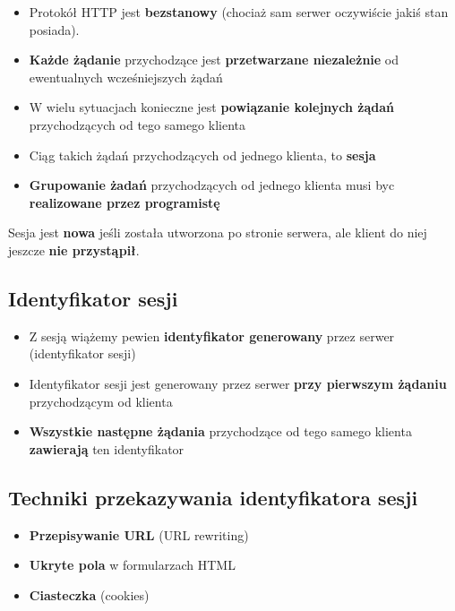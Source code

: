 \documentclass[../main.tex]{subfiles}
\begin{document}
    \begin{itemize}
        \item Protokół HTTP jest \textbf{bezstanowy} (chociaż sam serwer oczywiście jakiś stan posiada).
        \item \textbf{Każde żądanie} przychodzące jest \textbf{przetwarzane niezależnie} od ewentualnych wcześniejszych żądań
        \item W wielu sytuacjach konieczne jest \textbf{powiązanie kolejnych żądań} przychodzących od tego samego klienta
        \item Ciąg takich żądań przychodzących od jednego klienta, to \textbf{sesja}
        \item \textbf{Grupowanie żadań} przychodzących od jednego klienta musi byc \textbf{realizowane przez programistę}
    \end{itemize}

    \begin{theorem}
        Sesja jest \textbf{nowa} jeśli {została utworzona} po stronie serwera,
        ale klient do niej jeszcze \textbf{nie przystąpił}.
    \end{theorem}

    \subsection{Identyfikator sesji}
    \begin{itemize}
        \item Z sesją wiążemy pewien \textbf{identyfikator generowany} przez serwer (identyfikator sesji)
        \item Identyfikator sesji jest generowany przez serwer \textbf{przy pierwszym żądaniu} przychodzącym od klienta
        \item \textbf{Wszystkie następne żądania} przychodzące od tego samego klienta \textbf{zawierają} ten identyfikator
    \end{itemize}

    \subsection{Techniki przekazywania identyfikatora sesji}
    \begin{itemize}
        \item \textbf{Przepisywanie URL} (URL rewriting)
        \item \textbf{Ukryte pola} w formularzach HTML
        \item \textbf{Ciasteczka} (cookies)
    \end{itemize}
\end{document}

